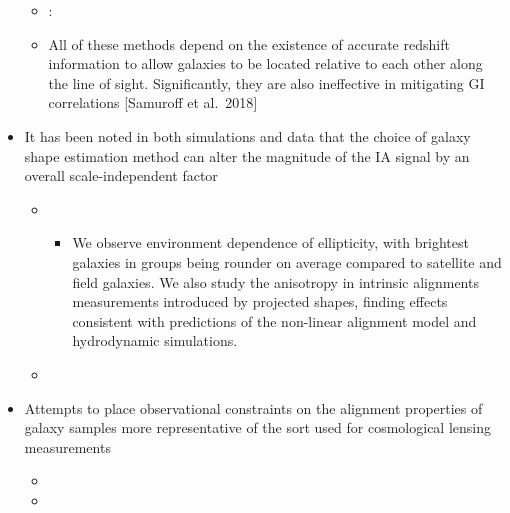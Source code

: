 \documentclass[letterpaper,10pt,english]{sphinxmanual}
\begin{document}
\begin{itemize}
\begin{itemize}
\begin{itemize}
\end{itemize}

\item {} 
: 

\item {} 
All of these methods depend on the existence of accurate redshift
information to allow galaxies to be located relative to each other
along the line of sight. Significantly, they are also ineffective
in mitigating GI correlations {[}Samuroff et al. 2018{]}

\end{itemize}

\item {} 
It has been noted in both simulations and data that the choice of
galaxy shape estimation method can alter the magnitude of the IA
signal by an overall scale-independent factor
\begin{itemize}
\item {} 
\begin{itemize}
\item {} 
We observe environment dependence of ellipticity, with
brightest galaxies in groups being rounder on average compared
to satellite and field galaxies. We also study the anisotropy
in intrinsic alignments measurements introduced by projected
shapes, finding effects consistent with predictions of the
non-linear alignment model and hydrodynamic simulations.

\end{itemize}

\item {} 

\end{itemize}

\item {} 
Attempts to place observational constraints on the alignment
properties of galaxy samples more representative of the sort used for
cosmological lensing measurements
\begin{itemize}
\item {} 

\item {} 

\end{itemize}

\end{itemize}
\end{document}
